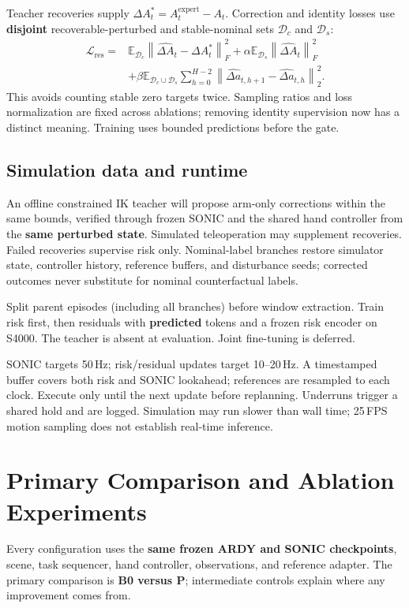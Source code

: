 \documentclass[11pt,a4paper]{article}
\newcommand{\norm}[1]{\left\lVert#1\right\rVert}
\begin{document}
Teacher recoveries supply $\Delta A_t^*=A_t^{\mathrm{expert}}-A_t$.
Correction and identity losses use \textbf{disjoint} recoverable-perturbed and
stable-nominal sets $\mathcal D_c$ and $\mathcal D_s$:
\[
\begin{aligned}
\mathcal L_{\mathrm{res}}={}&
\mathbb E_{\mathcal D_c}\norm{\widehat{\Delta A}_t-\Delta A_t^*}_F^2
+\alpha\mathbb E_{\mathcal D_s}\norm{\widehat{\Delta A}_t}_F^2\\
&+\beta\mathbb E_{\mathcal D_c\cup\mathcal D_s}
\sum_{h=0}^{H-2}\norm{\widehat{\Delta a}_{t,h+1}-\widehat{\Delta a}_{t,h}}_2^2.
\end{aligned}
\]
This avoids counting stable zero targets twice. Sampling ratios and loss
normalization are fixed across ablations; removing identity supervision now
has a distinct meaning. Training uses bounded predictions before the gate.

\subsection{Simulation data and runtime}
An offline constrained IK teacher will propose arm-only corrections within
the same bounds, verified through frozen SONIC and the shared hand controller
from the \textbf{same perturbed state}. Simulated teleoperation may supplement
recoveries. Failed recoveries supervise risk only. Nominal-label branches
restore simulator state, controller history, reference buffers, and disturbance
seeds; corrected outcomes never substitute for nominal counterfactual labels.

Split parent episodes (including all branches) before window extraction. Train risk first,
then residuals with \textbf{predicted} tokens and a frozen risk encoder on S4000.
The teacher is absent at evaluation. Joint fine-tuning is deferred.

SONIC targets 50\,Hz; risk/residual updates target 10--20\,Hz. A timestamped
buffer covers both risk and SONIC lookahead; references are resampled to each
clock. Execute only until the next update before replanning. Underruns trigger
a shared hold and are logged. Simulation may run slower than wall time;
25\,FPS motion sampling does not establish real-time inference.

\newpage
\section{Primary Comparison and Ablation Experiments}
Every configuration uses the \textbf{same frozen ARDY and SONIC checkpoints},
scene, task sequencer, hand controller, observations, and reference adapter.
The primary comparison is \textbf{B0 versus P}; intermediate controls explain
where any improvement comes from.
\end{document}
